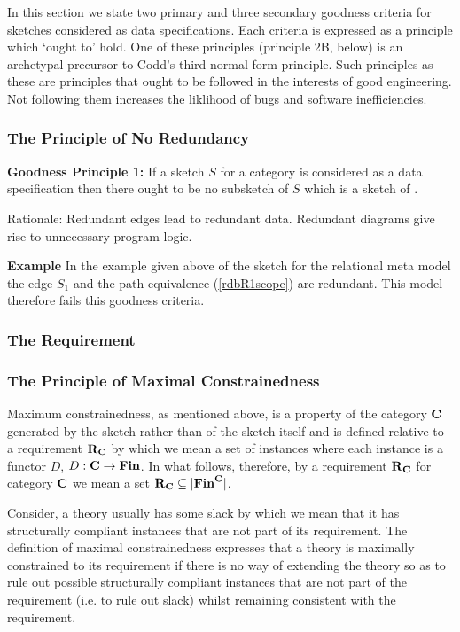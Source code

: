 In this section we state two primary and three secondary goodness criteria for sketches considered as data specifications. Each criteria is expressed as a principle which `ought to' hold. One of these principles (principle 2B, below) is an archetypal precursor to Codd's third normal form principle. 
Such principles as these are principles that ought to be followed in the interests of good engineering. Not following them increases the liklihood of bugs and software inefficiencies.   

\subsubsection{The Principle of No Redundancy}
\textbf{Goodness Principle 1:} If a sketch $S$ for a category \catcw 
is considered as a data specification then  there ought to be no subsketch of $S$ which is a sketch of \catcw. 

Rationale: Redundant edges lead to redundant data. Redundant diagrams give rise to unnecessary program logic.

\textbf{Example} In the example given above of the sketch for the relational meta model 
the edge $S_1$ and the path equivalence (\ref{rdbR1scope}) are redundant. This model therefore fails this 
goodness criteria. 
\subsubsection{The Requirement}
\subsubsection{The Principle of Maximal Constrainedness}
Maximum constrainedness, as mentioned above, is a property of the category $\textbf{C}$ generated by the sketch  rather than of the sketch itself and is defined  relative to a requirement $\textbf{R}_{\textbf{C}}$ by which we mean a set of 
instances where each instance is a functor $D$, $D: \textbf{C} \rightarrow \textbf{Fin}$. In what follows, therefore,  by a requirement $\textbf{R}_{\textbf{C}}$ for category $\textbf{C}$ we mean a set  $\textbf{R}_{\textbf{C}} \subseteq | \textbf{Fin}^{\textbf{C}} |$. 

Consider, a theory usually has some slack by which we mean that it has structurally compliant instances that are not part of its requirement.  The definition of maximal constrainedness expresses that a theory is maximally constrained to its requirement if there is no way of extending the theory so as to rule out possible structurally compliant instances that are not part of the requirement (i.e. to rule out slack) whilst remaining consistent with the requirement.

